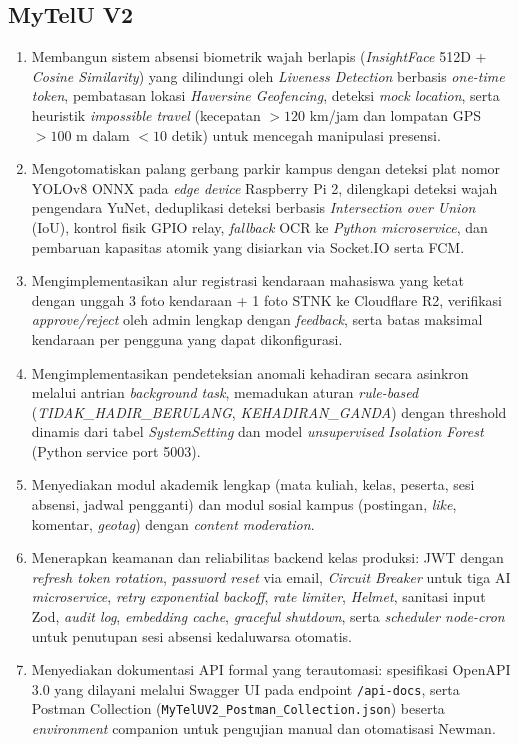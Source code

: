 \documentclass[12pt,titlepage,a4paper]{report}
\begin{document}
\subsection{MyTelU V2}
\begin{enumerate}
    \item Membangun sistem absensi biometrik wajah berlapis (\textit{InsightFace} 512D + \textit{Cosine Similarity}) yang dilindungi oleh \textit{Liveness Detection} berbasis \textit{one-time token}, pembatasan lokasi \textit{Haversine Geofencing}, deteksi \textit{mock location}, serta heuristik \textit{impossible travel} (kecepatan $>120$ km/jam dan lompatan GPS $>100$ m dalam $<10$ detik) untuk mencegah manipulasi presensi.
    \item Mengotomatiskan palang gerbang parkir kampus dengan deteksi plat nomor YOLOv8 ONNX pada \textit{edge device} Raspberry Pi 2, dilengkapi deteksi wajah pengendara YuNet, deduplikasi deteksi berbasis \textit{Intersection over Union} (IoU), kontrol fisik GPIO relay, \textit{fallback} OCR ke \textit{Python microservice}, dan pembaruan kapasitas atomik yang disiarkan via Socket.IO serta FCM.
    \item Mengimplementasikan alur registrasi kendaraan mahasiswa yang ketat dengan unggah 3 foto kendaraan + 1 foto STNK ke Cloudflare R2, verifikasi \textit{approve/reject} oleh admin lengkap dengan \textit{feedback}, serta batas maksimal kendaraan per pengguna yang dapat dikonfigurasi.
    \item Mengimplementasikan pendeteksian anomali kehadiran secara asinkron melalui antrian \textit{background task}, memadukan aturan \textit{rule-based} (\textit{TIDAK\_HADIR\_BERULANG}, \textit{KEHADIRAN\_GANDA}) dengan threshold dinamis dari tabel \textit{SystemSetting} dan model \textit{unsupervised} \textit{Isolation Forest} (Python service port 5003).
    \item Menyediakan modul akademik lengkap (mata kuliah, kelas, peserta, sesi absensi, jadwal pengganti) dan modul sosial kampus (postingan, \textit{like}, komentar, \textit{geotag}) dengan \textit{content moderation}.
    \item Menerapkan keamanan dan reliabilitas backend kelas produksi: JWT dengan \textit{refresh token rotation}, \textit{password reset} via email, \textit{Circuit Breaker} untuk tiga AI \textit{microservice}, \textit{retry} \textit{exponential backoff}, \textit{rate limiter}, \textit{Helmet}, sanitasi input Zod, \textit{audit log}, \textit{embedding cache}, \textit{graceful shutdown}, serta \textit{scheduler node-cron} untuk penutupan sesi absensi kedaluwarsa otomatis.
    \item Menyediakan dokumentasi API formal yang terautomasi: spesifikasi OpenAPI 3.0 yang dilayani melalui Swagger UI pada endpoint \texttt{/api-docs}, serta Postman Collection (\texttt{MyTelUV2\_Postman\_Collection.json}) beserta \textit{environment} companion untuk pengujian manual dan otomatisasi Newman.
\end{enumerate}
\end{document}
